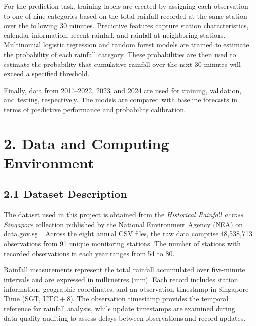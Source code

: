 \documentclass[11pt,a4paper]{article}
\begin{document}
For the prediction task, training labels are created by assigning each observation to one of nine categories based on the total rainfall recorded at the same station over the following 30 minutes. Predictive features capture station characteristics, calendar information, recent rainfall, and rainfall at neighboring stations. Multinomial logistic regression and random forest models are trained to estimate the probability of each rainfall category. These probabilities are then used to estimate the probability that cumulative rainfall over the next 30 minutes will exceed a specified threshold.


Finally, data from 2017–2022, 2023, and 2024 are used for training, validation, and testing, respectively. The models are compared with baseline forecasts in terms of predictive performance and probability calibration.


\FloatBarrier

\section*{2. Data and Computing Environment}
{}


\subsection*{2.1 Dataset Description}
{}


The dataset used in this project is obtained from the \textit{Historical Rainfall across Singapore} collection published by the National Environment Agency (NEA) on \href{https://data.gov.sg/collections/2279/view}{data.gov.sg}~\citep{nea_rainfall}. Across the eight annual CSV files, the raw data comprise 48,538,713 observations from 91 unique monitoring stations. The number of stations with recorded observations in each year ranges from 54 to 80.


Rainfall measurements represent the total rainfall accumulated over five-minute intervals and are expressed in millimetres (mm). Each record includes station information, geographic coordinates, and an observation timestamp in Singapore Time (SGT, \(\mathrm{UTC}{+}8\)). The observation timestamp provides the temporal reference for rainfall analysis, while update timestamps are examined during data-quality auditing to assess delays between observations and record updates.
\end{document}
